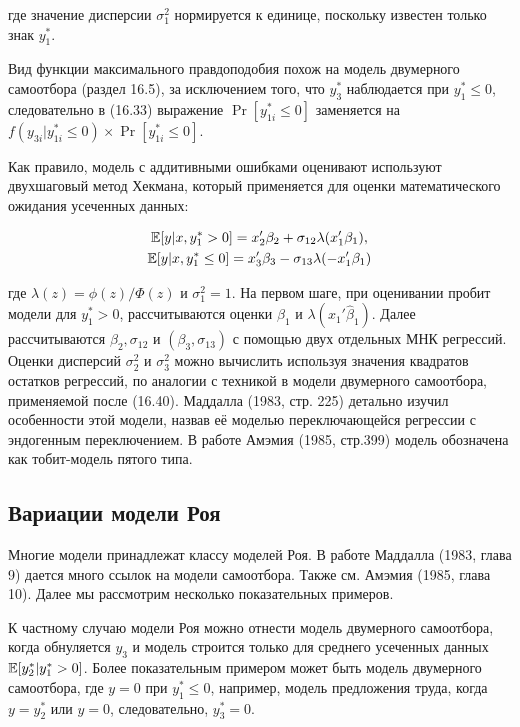 где значение дисперсии $\sigma^2_1$ нормируется к единице, поскольку известен только знак $y_1^{*}$.

Вид функции максимального правдоподобия похож на модель двумерного самоотбора (раздел 16.5), за исключением того, что $y_3^{*}$ наблюдается при $y_1^{*} \leq 0$, следовательно в (16.33) выражение  $\Pr[ y_{1i}^{*} \leq 0]$ заменяется на $f(y_{3i}|y_{1i}^* \leq 0){\times}\Pr[ y_{1i}^{*} \leq 0].$

Как правило, модель с аддитивными ошибками оценивают используют двухшаговый метод Хекмана, который применяется для оценки математического ожидания усеченных данных:

\begin{multline}
\mathbb{E}[y|x,y_1^* > 0]=x_2'\beta_2+\sigma_{12}\lambda(x_1'\beta_1), \\
\mathbb{E}[y|x,y_1^*\leq 0]=x_3'\beta_3-\sigma_{13}\lambda(-x_1'\beta_1)
\end{multline}

где $\lambda(z)=\phi(z)/\Phi(z)$ и $\sigma_1^{2}=1$. На первом шаге, при оценивании пробит модели для $y_1^{*}>0$, рассчитываются оценки $\beta_1$ и $\lambda(x_1'\hat{\beta}_1)$. Далее рассчитываются $\beta_2, \sigma_{12}$ и $(\beta_3,\sigma_{13})$ с помощью двух отдельных МНК регрессий. Оценки дисперсий $\sigma_2^2$ и $\sigma_3^2$ можно вычислить используя значения квадратов остатков регрессий, по аналогии с техникой в модели двумерного самоотбора, применяемой после (16.40). Маддалла (1983, стр. 225) детально изучил особенности этой модели, назвав её моделью переключающейся регрессии с эндогенным переключением. В работе Амэмия (1985, стр.399) модель обозначена как тобит-модель пятого типа.

\subsection{Вариации модели Роя}

Многие модели принадлежат классу моделей Роя. В работе Маддалла (1983, глава 9) дается много ссылок на модели самоотбора. Также см. Амэмия (1985, глава 10). Далее мы рассмотрим несколько показательных примеров.

К частному случаю модели Роя можно отнести модель двумерного самоотбора, когда обнуляется $y_3$ и модель строится только для среднего усеченных данных $\mathbb{E}[y_2^{*}|y_1^{*}>0]$. Более показательным примером может быть модель двумерного самоотбора, где $y=0$ при $y_1^{*} \leq 0$, например, модель предложения труда, когда $y=y_2^{*}$ или $y=0$, следовательно, $y_3^{*}=0$.

